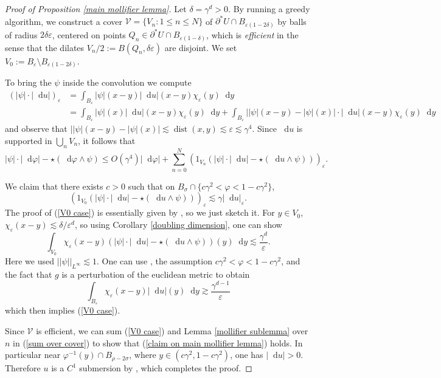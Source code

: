 \documentclass[reqno,10pt]{amsart}
\newcommand*\dif{\mathop{}\!\mathrm{d}}
\DeclareMathOperator{\dist}{dist}
\newcommand{\dfn}[1]{\emph{#1}\index{#1}}
\theoremstyle{definition}
\numberwithin{equation}{section}
\begin{document}
\begin{proof}[Proof of Proposition \ref{main mollifier lemma}]
Let $\delta = \gamma^d > 0$.
By running a greedy algorithm, we construct a cover $\mathcal V = \{V_n: 1 \leq n \leq N\}$ of $\partial^* U \cap B_{\varepsilon(1 - 2\delta)}$ by balls of radius $2\delta\varepsilon$, centered on points $Q_n \in \partial^* U \cap B_{\varepsilon(1 - \delta)}$, which is \dfn{efficient} in the sense that the dilates $V_n/2 := B(Q_n, \delta\varepsilon)$ are disjoint.
We set $V_0 := B_\varepsilon \setminus B_{\varepsilon(1 - 2\delta)}$.

To bring the $\psi$ inside the convolution we compute
\begin{align*}
(|\psi| \cdot |\dif u|)_\varepsilon
&= \int_{B_\varepsilon} |\psi|(x - y) |\dif u|(x - y) \chi_\varepsilon(y) \dif y \\
&= \int_{B_\varepsilon} |\psi|(x) |\dif u|(x - y) \chi_\varepsilon(y) \dif y + \int_{B_\varepsilon} ||\psi|(x - y) - |\psi|(x)| \cdot |\dif u|(x - y) \chi_\varepsilon(y) \dif y
\end{align*}
and observe that $||\psi|(x - y) - |\psi|(x)| \lesssim \dist(x, y) \lesssim \varepsilon \lesssim \gamma^4$.
Since $\dif u$ is supported in $\bigcup_n V_n$, it follows that
\begin{equation}\label{sum over cover}
|\psi| \cdot |\dif \varphi| - \star(\dif \varphi \wedge \psi)
\leq O(\gamma^4) |\dif \varphi| + \sum_{n=0}^N (1_{V_n}(|\psi| \cdot |\dif u| - \star(\dif u \wedge \psi)))_\varepsilon.
\end{equation}

We claim that there exists $c > 0$ such that on $B_\sigma \cap \{c\gamma^2 < \varphi < 1 - c\gamma^2\}$,
\begin{equation}\label{V0 case}
(1_{V_0}(|\psi| \cdot |\dif u| - \star(\dif u \wedge \psi)))_\varepsilon \lesssim \gamma |\dif u|_\varepsilon.
\end{equation}
The proof of (\ref{V0 case}) is essentially given by \cite[pg92]{Giusti77}, so we just sketch it.
For $y \in V_0$, $\chi_\varepsilon(x - y) \lesssim \delta/\varepsilon^d$, so using Corollary \ref{doubling dimension}, one can show
$$\int_{V_0} \chi_\varepsilon(x - y)(|\psi| \cdot |\dif u| - \star(\dif u \wedge \psi))(y) \dif y \lesssim \frac{\gamma^d}{\varepsilon}.$$
Here we used $||\psi||_{L^\infty} \lesssim 1$.
One can use \cite[Lemma 7.1]{Giusti77}, the assumption $c\gamma^2 < \varphi < 1 - c\gamma^2$, and the fact that $g$ is a perturbation of the euclidean metric to obtain
$$\int_{B_\varepsilon} \chi_\varepsilon(x - y) |\dif u|(y) \dif y \gtrsim \frac{\gamma^{d - 1}}{\varepsilon}$$
which then implies (\ref{V0 case}).

Since $\mathcal V$ is efficient, we can sum (\ref{V0 case}) and Lemma \ref{mollifier sublemma} over $n$ in (\ref{sum over cover}) to show that (\ref{claim on main mollifier lemma}) holds.
In particular near $\varphi^{-1}(y) \cap B_{\rho - 2\sigma}$, where $y \in (c\gamma^2, 1 - c\gamma^2)$, one has $|\dif u| > 0$.
Therefore $u$ is a $C^1$ submersion by \cite[Lemma 7.1]{Giusti77}, which completes the proof.
\end{proof}
\end{document}
